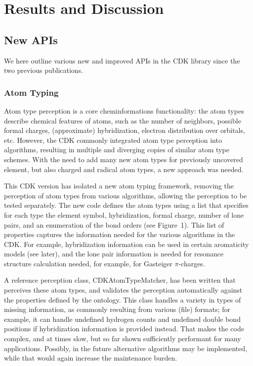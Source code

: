 \documentclass[10pt]{bmcart}
\begin{document}
\section*{Results and Discussion}

\subsection*{New APIs}

We here outline various new and improved APIs in the CDK library since the two previous
publications.

  \subsubsection*{Atom Typing}

  Atom type perception is a core cheminformations functionality: the atom types describe
  chemical features of atoms, such as the number of neighbors, possible formal charges,
  (approximate) hybridization, electron distribution over orbitals, etc. However, the
  CDK commonly integrated atom type perception into algorithms, resulting in multiple
  and diverging copies of similar atom type schemes. With the need to add many
  new atom types for previously uncovered element, but also charged and radical atom
  types, a new approach was needed.
  
  This CDK version has isolated a new atom typing framework, removing the perception of
  atom types from various algorithms, allowing the perception to be tested separately.
  The new code defines the atom types using a list that specifies for each type
  the element symbol, hybridization, formal charge, number of lone pairs, and
  an enumeration of the bond orders (see Figure~1). This list of properties captures the
  information needed for the various algorithms in the CDK. For example,
  hybridization information can be used in certain aromaticity models (see later),
  and the lone pair information is needed for resonance structure calculation
  needed, for example, for Gasteiger $\pi$-charges.

  A reference perception class, CDKAtomTypeMatcher, has been written that perceives these atom types, and
  validates the perception automatically against the properties defined by the ontology.
  This class handles a variety in types of missing information, as commonly resulting
  from various (file) formats; for example, it can handle undefined hydrogen counts
  and undefined double bond positions if hybridization information is provided instead.
  That makes the code complex, and at times slow, but so far shown sufficiently
  performant for many applications. Possibly, in the future
  alternative algorithms may be implemented, while that would again increase the maintenance
  burden.
\end{document}
